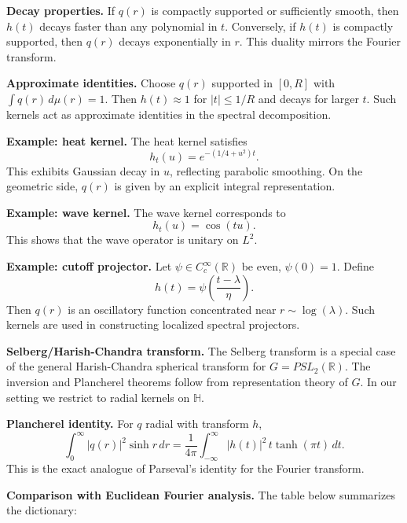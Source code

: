 \medskip

\noindent\textbf{Decay properties.}
If $q(r)$ is compactly supported or sufficiently smooth,
then $h(t)$ decays faster than any polynomial in $t$.
Conversely,
if $h(t)$ is compactly supported,
then $q(r)$ decays exponentially in $r$.
This duality mirrors the Fourier transform.

\medskip

\noindent\textbf{Approximate identities.}
Choose $q(r)$ supported in $[0,R]$ with $\int q(r)\,d\mu(r)=1$.
Then $h(t)\approx 1$ for $|t|\le 1/R$ and decays for larger $t$.
Such kernels act as approximate identities in the spectral decomposition.

\medskip

\noindent\textbf{Example: heat kernel.}
The heat kernel satisfies
\[
  h_{t}(u) = e^{-(1/4+u^{2})t}.
\]
This exhibits Gaussian decay in $u$, reflecting parabolic smoothing.
On the geometric side,
$q(r)$ is given by an explicit integral representation.

\medskip

\noindent\textbf{Example: wave kernel.}
The wave kernel corresponds to
\[
  h_{t}(u) = \cos(tu).
\]
This shows that the wave operator is unitary on $L^{2}$.

\medskip

\noindent\textbf{Example: cutoff projector.}
Let $\psi\in C^{\infty}_{c}(\mathbb{R})$ be even, $\psi(0)=1$.
Define
\[
  h(t) = \psi\!\left(\frac{t-\lambda}{\eta}\right).
\]
Then $q(r)$ is an oscillatory function concentrated near $r\sim \log(\lambda)$.
Such kernels are used in constructing localized spectral projectors.

\medskip

\noindent\textbf{Selberg/Harish-Chandra transform.}
The Selberg transform is a special case of the general Harish-Chandra spherical transform
for $G=PSL_{2}(\mathbb{R})$.
The inversion and Plancherel theorems follow from representation theory of $G$.
In our setting we restrict to radial kernels on $\mathbb{H}$.

\medskip

\noindent\textbf{Plancherel identity.}
For $q$ radial with transform $h$,
\[
  \int_{0}^{\infty} |q(r)|^{2}\sinh r\,dr
  = \frac{1}{4\pi}\int_{-\infty}^{\infty} |h(t)|^{2}\,t\tanh(\pi t)\,dt.
\]
This is the exact analogue of Parseval’s identity for the Fourier transform.

\medskip

\noindent\textbf{Comparison with Euclidean Fourier analysis.}
The table below summarizes the dictionary:

